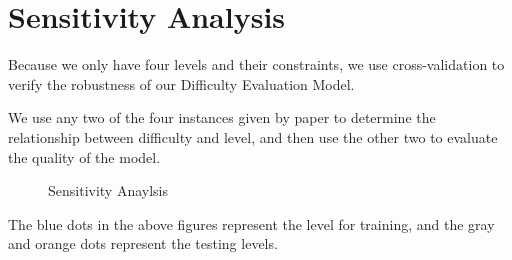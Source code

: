 \documentclass{mcmthesis}
\begin{document}
			
		
	

		

	\section{Sensitivity Analysis}
		
		Because we only have four levels and their constraints, we use cross-validation to verify the robustness of our Difficulty Evaluation Model.
		
		We use any two of the four instances given by paper to determine the relationship between difficulty and level, and then use the other two to evaluate the quality of the model.
		
		\begin{figure}[htbp]
			\centering
		
			\quad
			\centering
			\caption{Sensitivity Anaylsis}
		\end{figure}
	
		The blue dots in the above figures represent the level for training, and the gray and orange dots represent the testing levels.
		
		\clearpage
		
\end{document}

